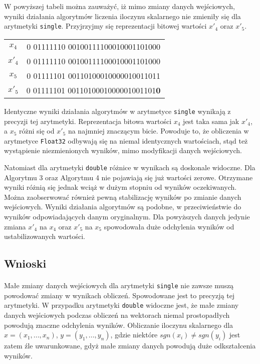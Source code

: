 \documentclass[a4paper]{article}
\begin{document}
W powyższej tabeli można zauważyć, iż mimo zmiany danych wejściowych, wyniki działania algorytmów liczenia iloczynu skalarnego nie zmieniły się dla arytmetyki \texttt{single}. Przyjrzyjmy się reprezentacji bitowej wartości $x'_{4}$ oraz $x'_{5}$.

\begin{center}
\begin{tabular}{ |c|c| } 
 \hline
 $x_{4}$ & 0 01111110 00100111100010001101000 \\ 
 $x'_{4}$ & 0 01111110 00100111100010001101000 \\ 
 $x_{5}$ & 0 01111101 00110100010000010011011 \\
 $x'_{5}$ & 0 01111101 0011010001000001001101\textbf{0} \\ 
 \hline
\end{tabular}
\end{center}

Identyczne wyniki działania algorytmów w arytmetyce \texttt{single} wynikają z precyzji tej arytmetyki. Reprezentacja bitowa wartości $x_{4}$ jest taka sama jak $x'_{4}$, a $x_{5}$ różni się od $x'_{5}$ na najmniej znaczącym bicie. Powoduje to, że obliczenia w arytmetyce \texttt{Float32} odbywają się na niemal identycznych wartościach, stąd też wystąpienie niezmienionych wyników, mimo modyfikacji danych wejściowych.

Natomiast dla arytmetyki \texttt{double} różnice w wynikach są doskonale widoczne. Dla Algorytmu 3 oraz Algorytmu 4 nie pojawiają się już wartości zerowe. Otrzymane wyniki różnią się jednak wciąż w dużym stopniu od wyników oczekiwanych. Można zaobserwować również pewną stabilizację wyników po zmianie danych wejściowych. Wyniki działania algorytmów są podobne, w przeciwieństwie do wyników odpowiadających danym oryginalnym. Dla powyższych danych jedynie zmiana $x'_{4}$ na $x_{4}$ oraz $x'_{5}$ na $x_{5}$ spowodowała duże odchylenia wyników od ustabilizowanych wartości. 
\subsection{Wnioski}
\paragraph{}
Małe zmiany danych wejściowych dla arytmetyki \texttt{single} nie zawsze muszą powodować zmiany w wynikach obliczeń. Spowodowane jest to precyzją tej arytmetyki. W przypadku arytmetyki \texttt{double} widoczne jest, że małe zmiany danych wejściowych podczas obliczeń na wektorach niemal prostopadłych powodują znaczne odchylenia wyników. Obliczanie iloczynu skalarnego dla $x = (x_{1}, ..., x_{n})$, $y = (y_{1}, ..., y_{n})$, gdzie 
niektóre $sgn(x_{i}) \neq sgn(y_{i})$ jest zatem źle uwarunkowane, gdyż małe zmiany danych powodują duże odkształcenia wyników.
\pagebreak
\end{document}
